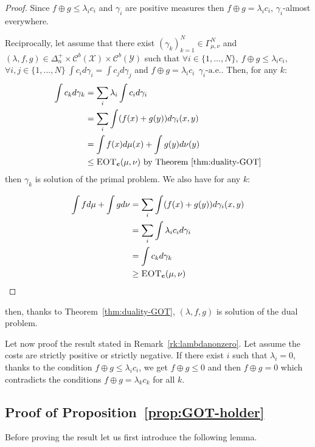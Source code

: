 \begin{proof}
Since $f\oplus g\leq \lambda_ic_i$ and $\gamma_i$ are positive measures then $f\oplus g= \lambda_ic_i$, $\gamma_i$-almost everywhere.


Reciprocally, let assume that there exist $(\gamma_k)_{k=1}^N\in\Gamma^N_{\mu,\nu}$ and $(\lambda,f,g)\in \Delta_n^{+}\times\mathcal{C}^b(\mathcal{X})\times\mathcal{C}^b(\mathcal{Y})$ such that $\forall i\in\{1,...,N\},~ f\oplus g\leq\lambda_i c_i$,  $\forall i,j\in\{1,...,N\}~\int c_i d\gamma_i=\int c_j d\gamma_j$ and $f \oplus g= \lambda_i c_i ~~\gamma_{i}\text{-a.e.}$. Then, for any $k$:
\begin{align*}
\int c_k d\gamma_k &= \sum_i\lambda_i\int c_id\gamma_i\\
&= \sum_i\int(f(x)+g(y))d\gamma_i(x,y)\\
&= \int f(x)d\mu(x)+\int g(y)d\nu(y)\\
&\leq \textsc{EOT}_{\mathbf{c}}(\mu,\nu)\text{ by Theorem~\ref{thm:duality-GOT}}
\end{align*}
then $\gamma_k$ is solution of the primal problem. We also have for any $k$:

\begin{align*}
\int fd\mu +\int gd\nu &= \sum_i\int(f(x)+g(y))d\gamma_i(x,y)\\
&= \sum_i\int\lambda_i c_id\gamma_i\\
&=\int c_k d\gamma_k\\
&\geq \textsc{EOT}_{\mathbf{c}}(\mu,\nu)\\
\end{align*}
\end{proof}
then, thanks to Theorem~\ref{thm:duality-GOT}, $(\lambda,f,g)$ is solution of the dual problem.

Let now proof the result stated in Remark~\ref{rk:lambdanonzero}. Let assume the costs are strictly positive or strictly negative. If there exist $i$ such that $\lambda_i=0$, thanks to the condition $f\oplus g\leq \lambda_i c_i$, we get $f\oplus g\leq0$ and then $f\oplus g=0$ which contradicts the conditions $f\oplus g = \lambda_kc_k$ for all $k$. 




\subsection{Proof of Proposition~\ref{prop:GOT-holder}}
\label{prv:GOT-holder}



Before proving the result let us first introduce the following lemma.

